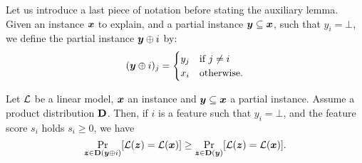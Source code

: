Let us introduce a last piece of notation before stating the auxiliary lemma. Given an instance ${\bm{x}}$ to explain, and a partial instance ${\bm{y}} \subseteq {\bm{x}}$, such that $y_i = \bot$, we define the partial instance ${\bm{y}} \oplus i$ by:
\[ 
    ({\bm{y}} \oplus i)_j = \begin{cases}
        y_j & \text{if } j \neq i\\
        x_i & \text{otherwise}.
    \end{cases}
\]
\begin{lemma}\label{lemma:positive-score}
Let $\mathcal{L}$ be a linear model, ${\bm{x}}$ an instance and ${\bm{y}} \subseteq {\bm{x}}$ a partial instance. Assume a product distribution $\mathbf{D}$. Then, if $i$ is a feature such that $y_i = \bot$, and the feature score $s_i$ holds $s_i \geq 0$, we have 
\[ 
\Pr_{{\bm{z}} \in \mathbf{D}({\bm{y}} \oplus i)}[\mathcal{L}({\bm{z}}) = \mathcal{L}({\bm{x}})] \geq \Pr_{{\bm{z}} \in \mathbf{D}({\bm{y}})}[\mathcal{L}({\bm{z}}) = \mathcal{L}({\bm{x}})].
\]
\end{lemma}

